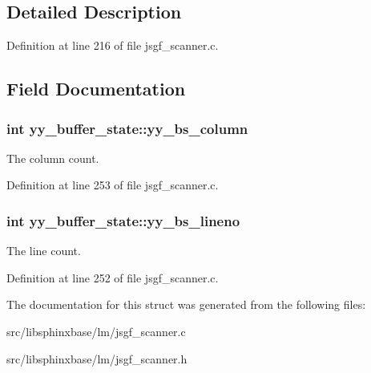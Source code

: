 \subsection{Detailed Description}


Definition at line 216 of file jsgf\-\_\-scanner.\-c.



\subsection{Field Documentation}
\subsubsection[{yy\-\_\-bs\-\_\-column}]{\setlength{\rightskip}{0pt plus 5cm}int yy\-\_\-buffer\-\_\-state\-::yy\-\_\-bs\-\_\-column}\label{structyy__buffer__state_a10c4fcd8be759e6bf11e6d3e8cdb0307}


The column count. 



Definition at line 253 of file jsgf\-\_\-scanner.\-c.

\subsubsection[{yy\-\_\-bs\-\_\-lineno}]{\setlength{\rightskip}{0pt plus 5cm}int yy\-\_\-buffer\-\_\-state\-::yy\-\_\-bs\-\_\-lineno}\label{structyy__buffer__state_a818e94bc9c766e683c60df1e9fd01199}


The line count. 



Definition at line 252 of file jsgf\-\_\-scanner.\-c.



The documentation for this struct was generated from the following files\-:\begin{DoxyCompactItemize}
\item 
src/libsphinxbase/lm/jsgf\-\_\-scanner.\-c\item 
src/libsphinxbase/lm/jsgf\-\_\-scanner.\-h\end{DoxyCompactItemize}
